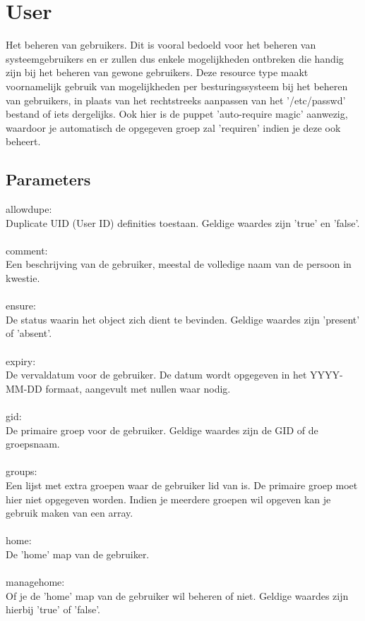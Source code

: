 \section{User}
%
Het beheren van gebruikers. Dit is vooral bedoeld voor het beheren van systeemgebruikers en er zullen dus enkele mogelijkheden ontbreken die handig zijn bij het beheren van gewone gebruikers. Deze resource type maakt voornamelijk gebruik van mogelijkheden per besturingssysteem bij het beheren van gebruikers, in plaats van het rechtstreeks aanpassen van het '/etc/passwd' bestand of iets dergelijks. Ook hier is de puppet 'auto-require magic' aanwezig, waardoor je automatisch de opgegeven groep zal 'requiren' indien je deze ook beheert.
%
\subsection{Parameters}
allowdupe:\\
Duplicate UID (User ID) definities toestaan. Geldige waardes zijn 'true' en 'false'.\\\\
%
comment:\\
Een beschrijving van de gebruiker, meestal de volledige naam van de persoon in kwestie.\\\\
%
ensure:\\
De status waarin het object zich dient te bevinden. Geldige waardes zijn 'present' of 'absent'.\\\\
%
expiry:\\
De vervaldatum voor de gebruiker. De datum wordt opgegeven in het YYYY-MM-DD formaat, aangevult met nullen waar nodig.\\\\
%
gid:\\
De primaire groep voor de gebruiker. Geldige waardes zijn de GID of de groepsnaam.\\\\
%
groups:\\
Een lijst met extra groepen waar de gebruiker lid van is. De primaire groep moet hier niet opgegeven worden. Indien je meerdere groepen wil opgeven kan je gebruik maken van een array.\\\\
%
home:\\
De 'home' map van de gebruiker.\\\\
%
managehome:\\
Of je de 'home' map van de gebruiker wil beheren of niet. Geldige waardes zijn hierbij 'true' of 'false'.\\\\
